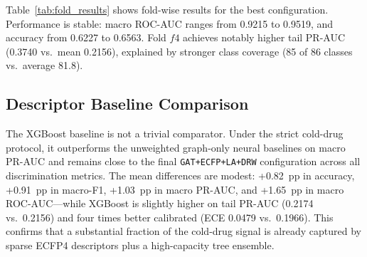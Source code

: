 \documentclass[11pt,a4paper,twocolumn]{article}
\begin{document}
Table~\ref{tab:fold_results} shows fold-wise results for the best configuration.
Performance is stable: macro ROC-AUC ranges from 0.9215 to 0.9519, and accuracy from
0.6227 to 0.6563.
Fold $f4$ achieves notably higher tail PR-AUC (0.3740 vs.\ mean 0.2156), explained
by stronger class coverage (85 of 86 classes vs.\ average 81.8).

\begin{table}[tp]
\centering
\caption{Fold-wise test performance of GAT+ECFP+LA+DRW.}
\label{tab:fold_results}
\end{table}

\subsection{Descriptor Baseline Comparison}
\label{sec:xgb_comparison}
The XGBoost baseline is not a trivial comparator.
Under the strict cold-drug protocol, it outperforms the unweighted graph-only
neural baselines on macro PR-AUC and remains close to the final
\texttt{GAT+ECFP+LA+DRW} configuration across all discrimination metrics.
The mean differences are modest: +0.82~pp in accuracy, +0.91~pp in macro-F1,
+1.03~pp in macro PR-AUC, and +1.65~pp in macro ROC-AUC---while XGBoost is
slightly higher on tail PR-AUC (0.2174 vs.\ 0.2156) and
four times better calibrated (ECE 0.0479 vs.\ 0.1966).
This confirms that a substantial fraction of the cold-drug signal is already
captured by sparse ECFP4 descriptors plus a high-capacity tree ensemble.
\end{document}
